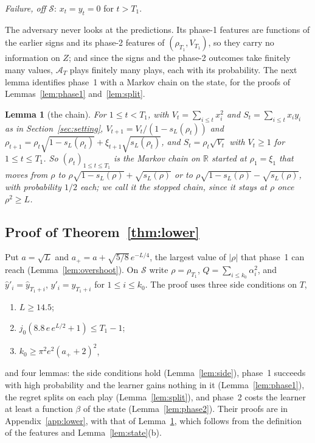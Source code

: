 \documentclass[12pt]{amsart}
\newtheorem{lemma}[theorem]{Lemma}
\theoremstyle{definition}
\numberwithin{equation}{section}
\newcommand{\R}{\mathbb{R}}
\newcommand{\yh}{\hat y}
\newcommand{\Succ}{\mathcal{S}}
\newcommand{\leanmap}[1]{\ignorespaces}
\begin{document}
\emph{Failure, off $\Succ$}: $x_t=y_t=0$ for $t>T_1$.

The adversary never looks at the predictions. Its phase-1 features are functions of the earlier signs and its phase-2 features of $(\rho_{T_1},V_{T_1})$, so they carry no information on $Z$; and since the signs and the phase-2 outcomes take finitely many values, $\mathcal A_T$ plays finitely many plays, each with its probability. The next lemma identifies phase~1 with a Markov chain on the state, for the proofs of Lemmas~\ref{lem:phase1} and~\ref{lem:split}.

\begin{lemma}[the chain]\label{lem:chain}
\leanmap{RegretKappa.LowerSharp.rhoS_eq_chainOf, RegretKappa.LowerSharp.sum_xS_sq, RegretKappa.LowerSharp.sum_xS_mul}
For $1\le t<T_1$, with $V_t=\sum_{i\le t}x_i^2$ and $S_t=\sum_{i\le t}x_iy_i$ as in Section~\ref{sec:setting}, $V_{t+1}=V_t/(1-s_L(\rho_t))$ and $\rho_{t+1}=\rho_t\sqrt{1-s_L(\rho_t)}+\xi_{t+1}\sqrt{s_L(\rho_t)}$, and $S_t=\rho_t\sqrt{V_t}$ with $V_t\ge1$ for $1\le t\le T_1$. So $(\rho_t)_{1\le t\le T_1}$ is the Markov chain on $\R$ started at $\rho_1=\xi_1$ that moves from $\rho$ to $\rho\sqrt{1-s_L(\rho)}+\sqrt{s_L(\rho)}$ or to $\rho\sqrt{1-s_L(\rho)}-\sqrt{s_L(\rho)}$, with probability $1/2$ each; we call it the stopped chain, since it stays at $\rho$ once $\rho^2\ge L$.
\end{lemma}

\subsection{Proof of Theorem~\ref{thm:lower}}\label{subsec:prooflower}
Put $a=\sqrt L$ and $a_+=a+\sqrt{5/8}\,e^{-L/4}$, the largest value of $|\rho|$ that phase~1 can reach (Lemma~\ref{lem:overshoot}). On $\Succ$ write $\rho=\rho_{T_1}$, $Q=\sum_{i\le k_0}\alpha_i^2$, and $\yh'_i=\yh_{T_1+i}$, $y'_i=y_{T_1+i}$ for $1\le i\le k_0$. The proof uses three side conditions on $T$,
\begin{enumerate}
\item[(C1)] $L\ge14.5$;
\item[(C2)] $j_0(8.8\,e\,e^{L/2}+1)\le T_1-1$;
\item[(C3)] $k_0\ge\pi^2e^2(a_++2)^2$,
\end{enumerate}
and four lemmas: the side conditions hold (Lemma~\ref{lem:side}), phase~1 succeeds with high probability and the learner gains nothing in it (Lemma~\ref{lem:phase1}), the regret splits on each play (Lemma~\ref{lem:split}), and phase~2 costs the learner at least a function $\beta$ of the state (Lemma~\ref{lem:phase2}). Their proofs are in Appendix~\ref{app:lower}, with that of Lemma~\ref{lem:chain}, which follows from the definition of the features and Lemma~\ref{lem:state}(b).
\end{document}
